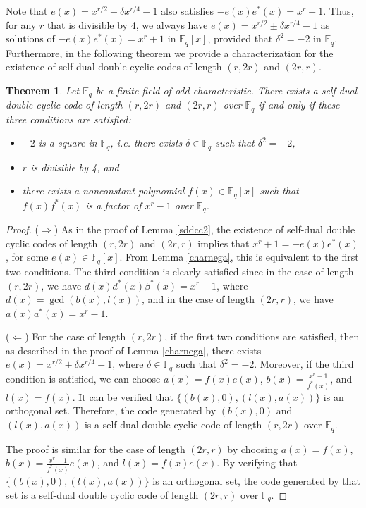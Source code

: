 \documentclass[12pt]{article}
\newtheorem{theorem}{Theorem}[section]
\begin{document}
	Note that $e(x)=x^{r/2}-\delta x^{r/4}-1$ also satisfies $-e(x)e^{*}(x)=x^r+1$. Thus, for any $r$ that is divisible by 4, we always have $e(x)=x^{r/2}\pm \delta x^{r/4}-1$ as solutions of $-e(x)e^{*}(x)=x^r+1$ in $\mathbb{F}_q[x]$, provided that $\delta^2=-2$ in $\mathbb{F}_q$. Furthermore, in the following theorem we provide a characterization for the existence of self-dual double cyclic codes of length $(r,2r)$ and $(2r,r)$.
	\begin{theorem}\label{caser2r}
		Let $\mathbb{F}_q$ be a finite field of odd characteristic. There exists a self-dual double cyclic code of length $(r,2r)$ and $(2r,r)$ over $\mathbb{F}_q$ if and only if these three conditions are satisfied:
		\begin{itemize}
			\item $-2$ is a square in $\mathbb{F}_q$, i.e. there exists $\delta\in\mathbb{F}_q$ such that $\delta^2=-2$,
			\item $r$ is divisible by 4, and
			\item there exists a nonconstant polynomial $f(x)\in\mathbb{F}_q[x]$ such that $f(x)f^{*}(x)$ is a factor of $x^r-1$ over $\mathbb{F}_q$.
		\end{itemize}
	\end{theorem}
	\begin{proof}
		($\Rightarrow$) As in the proof of Lemma \ref{sddcc2}, the existence of self-dual double cyclic codes of length $(r,2r)$ and $(2r,r)$ implies that $x^r+1=-e(x)e^{*}(x)$, for some $e(x)\in\mathbb{F}_q[x]$. From Lemma \ref{charnega}, this is equivalent to the first two conditions. The third condition is clearly satisfied since in the case of length $(r,2r)$, we have $d(x)d^{*}(x)\beta^{*}(x)=x^r-1$, where $d(x)=\gcd(b(x),l(x))$, and in the case of length $(2r,r)$, we have $a(x)a^{*}(x)=x^r-1$.
		
		($\Leftarrow$) For the case of length $(r,2r)$, if the first two conditions are satisfied, then as described in the proof of Lemma \ref{charnega}, there exists $e(x)=x^{r/2}+\delta x^{r/4}-1$, where $\delta\in\mathbb{F}_q$ such that $\delta^2=-2$. Moreover, if the third condition is satisfied, we can choose $a(x)=f(x)e(x)$, $b(x)=\frac{x^r-1}{f^{*}(x)}$, and $l(x)=f(x)$. It can be verified that $\{(b(x),0),(l(x),a(x))\}$ is an orthogonal set. Therefore, the code generated by $(b(x),0)$ and $(l(x),a(x))$ is a self-dual double cyclic code of length $(r,2r)$ over $\mathbb{F}_q$.
		
		The proof is similar for the case of length $(2r,r)$ by choosing $a(x)=f(x)$, $b(x)=\frac{x^r-1}{f^{*}(x)}e(x)$, and $l(x)=f(x)e(x)$. By verifying that $\{(b(x),0),(l(x),a(x))\}$ is an orthogonal set, the code generated by that set is a self-dual double cyclic code of length $(2r,r)$ over $\mathbb{F}_q$.
	\end{proof}
\end{document}
